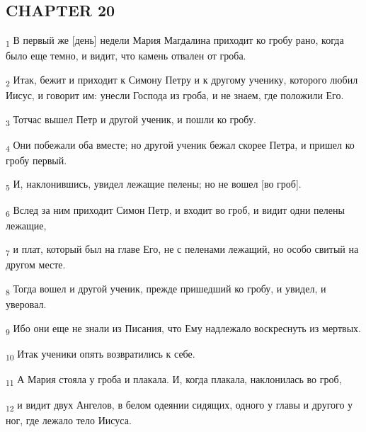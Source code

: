 \subsection{CHAPTER 20}
\begin{tcolorbox}
\textsubscript{1} В первый же [день] недели Мария Магдалина приходит ко гробу рано, когда было еще темно, и видит, что камень отвален от гроба.
\end{tcolorbox}
\begin{tcolorbox}
\textsubscript{2} Итак, бежит и приходит к Симону Петру и к другому ученику, которого любил Иисус, и говорит им: унесли Господа из гроба, и не знаем, где положили Его.
\end{tcolorbox}
\begin{tcolorbox}
\textsubscript{3} Тотчас вышел Петр и другой ученик, и пошли ко гробу.
\end{tcolorbox}
\begin{tcolorbox}
\textsubscript{4} Они побежали оба вместе; но другой ученик бежал скорее Петра, и пришел ко гробу первый.
\end{tcolorbox}
\begin{tcolorbox}
\textsubscript{5} И, наклонившись, увидел лежащие пелены; но не вошел [во гроб].
\end{tcolorbox}
\begin{tcolorbox}
\textsubscript{6} Вслед за ним приходит Симон Петр, и входит во гроб, и видит одни пелены лежащие,
\end{tcolorbox}
\begin{tcolorbox}
\textsubscript{7} и плат, который был на главе Его, не с пеленами лежащий, но особо свитый на другом месте.
\end{tcolorbox}
\begin{tcolorbox}
\textsubscript{8} Тогда вошел и другой ученик, прежде пришедший ко гробу, и увидел, и уверовал.
\end{tcolorbox}
\begin{tcolorbox}
\textsubscript{9} Ибо они еще не знали из Писания, что Ему надлежало воскреснуть из мертвых.
\end{tcolorbox}
\begin{tcolorbox}
\textsubscript{10} Итак ученики опять возвратились к себе.
\end{tcolorbox}
\begin{tcolorbox}
\textsubscript{11} А Мария стояла у гроба и плакала. И, когда плакала, наклонилась во гроб,
\end{tcolorbox}
\begin{tcolorbox}
\textsubscript{12} и видит двух Ангелов, в белом одеянии сидящих, одного у главы и другого у ног, где лежало тело Иисуса.
\end{tcolorbox}
